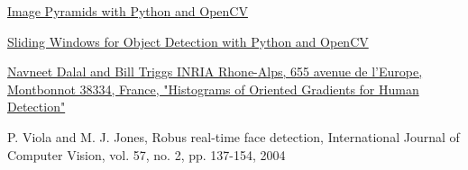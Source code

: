 \documentclass[12pt,a4paper]{article}
\begin{document}
\begin{thebibliography}{9}
            \href{https://www.pyimagesearch.com/2015/03/16/image-pyramids-with-python-and-opencv/}{Image Pyramids with Python and OpenCV}

            \href{https://www.pyimagesearch.com/2015/03/23/sliding-windows-for-object-detection-with-python-and-opencv/}{Sliding Windows for Object Detection with Python and OpenCV}

            \href{https://lear.inrialpes.fr/people/triggs/pubs/Dalal-cvpr05.pdf}{Navneet Dalal and Bill Triggs INRIA Rhone-Alps, 655 avenue de l’Europe, Montbonnot 38334, France, "Histograms of Oriented Gradients for Human Detection"}

            P. Viola and M. J. Jones, Robus real-time face detection, International Journal of Computer Vision, vol. 57, no. 2, pp. 137-154, 2004
		\end{thebibliography}
\end{document}
